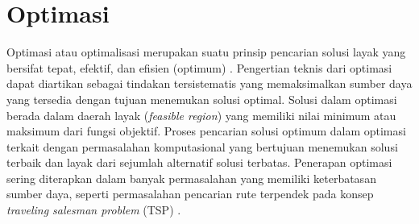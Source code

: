 \section{Optimasi}
\vspace{-4mm}
{\frenchspacing
    Optimasi atau optimalisasi merupakan suatu prinsip pencarian solusi layak yang bersifat tepat, efektif, dan efisien (optimum) .
    Pengertian teknis dari optimasi dapat diartikan sebagai tindakan tersistematis yang memaksimalkan sumber daya yang tersedia
    dengan tujuan menemukan solusi optimal.
    Solusi dalam optimasi berada dalam daerah layak (\textit{feasible region}) yang memiliki nilai minimum atau maksimum dari fungsi objektif.
    Proses pencarian solusi optimum dalam optimasi terkait dengan permasalahan komputasional yang bertujuan
    menemukan solusi terbaik dan layak dari sejumlah alternatif solusi terbatas.
    Penerapan optimasi sering diterapkan dalam banyak permasalahan yang memiliki keterbatasan sumber daya,
    seperti permasalahan pencarian rute terpendek pada konsep \textit{traveling salesman problem} (TSP) .
}
\vspace{-3mm}

